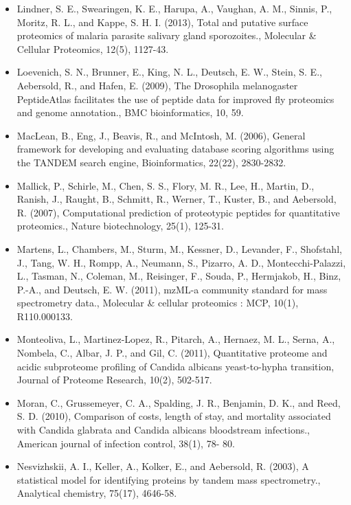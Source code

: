 \begin{itemize}
\item[]{
Lindner, S. E., Swearingen, K. E., Harupa, A., Vaughan, A. M., Sinnis, P., Moritz, R. L., and
Kappe, S. H. I. (2013), Total and putative surface proteomics of malaria parasite salivary
gland sporozoites., Molecular \& Cellular Proteomics, 12(5), 1127-43.
}

\item[]{
Loevenich, S. N., Brunner, E., King, N. L., Deutsch, E. W., Stein, S. E., Aebersold, R., and
Hafen, E. (2009), The Drosophila melanogaster PeptideAtlas facilitates the use of peptide
data for improved fly proteomics and genome annotation., BMC bioinformatics, 10, 59.
}

\item[]{
MacLean, B., Eng, J., Beavis, R., and McIntosh, M. (2006), General framework for developing
and evaluating database scoring algorithms using the TANDEM search engine, 
Bioinformatics, 22(22), 2830-2832.
}

\item[]{
Mallick, P., Schirle, M., Chen, S. S., Flory, M. R., Lee, H., Martin, D., Ranish, J., Raught, B.,
Schmitt, R., Werner, T., Kuster, B., and Aebersold, R. (2007), Computational prediction of
proteotypic peptides for quantitative proteomics., Nature biotechnology, 25(1), 125-31.
}

\item[]{
Martens, L., Chambers, M., Sturm, M., Kessner, D., Levander, F., Shofstahl, J., Tang, W. H.,
Rompp, A., Neumann, S., Pizarro, A. D., Montecchi-Palazzi, L., Tasman, N., Coleman, M.,
Reisinger, F., Souda, P., Hermjakob, H., Binz, P.-A., and Deutsch, E. W. (2011), mzML-a
community standard for mass spectrometry data., Molecular \& cellular proteomics : MCP,
10(1), R110.000133.
}

\item[]{
Monteoliva, L., Martinez-Lopez, R., Pitarch, A., Hernaez, M. L., Serna, A., Nombela, C., Albar,
J. P., and Gil, C. (2011), Quantitative proteome and acidic subproteome profiling of Candida
albicans yeast-to-hypha transition, Journal of Proteome Research, 10(2), 502-517.
}

\item[]{
Moran, C., Grussemeyer, C. A., Spalding, J. R., Benjamin, D. K., and Reed, S. D. (2010),
Comparison of costs, length of stay, and mortality associated with Candida glabrata and
Candida albicans bloodstream infections., American journal of infection control, 38(1), 78-
80.
}

\item[]{
Nesvizhskii, A. I., Keller, A., Kolker, E., and Aebersold, R. (2003), A statistical model for 
identifying proteins by tandem mass spectrometry., Analytical chemistry, 75(17), 4646-58.
}


\end{itemize}
